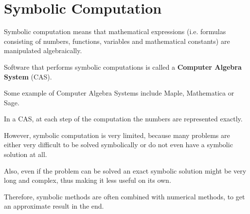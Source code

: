 \section{Symbolic Computation}
Symbolic computation means that mathematical expressions (i.e. formulas
consisting of numbers, functions, variables and mathematical constants) are
manipulated algebraically. 

Software that performs symbolic computations is
called a \textbf{Computer Algebra System} (CAS).

Some example of Computer Algebra Systems include Maple, Mathematica or Sage.

In a CAS, at each step of the computation the numbers are represented exactly.

However, symbolic computation is very limited, because many problems are either 
very difficult to be solved symbolically or do not even have a symbolic solution at all. 

Also, even if the problem can be solved an exact symbolic solution might be very long and complex, 
thus making it less useful on its own. 

Therefore, symbolic methods are often combined with numerical methods, 
to get an approximate result in the end.
